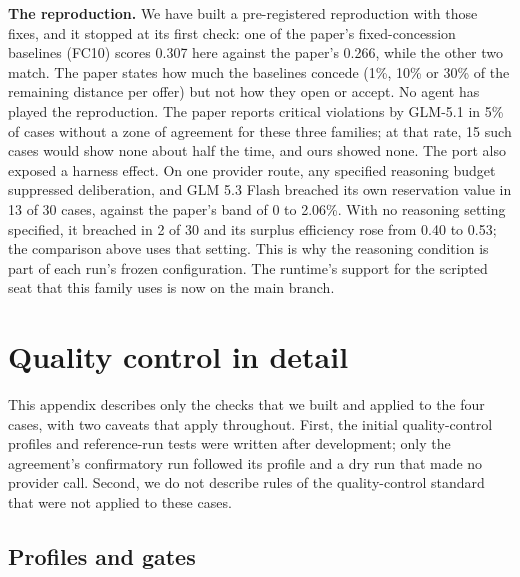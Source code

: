 \textbf{The reproduction.} We have built a pre-registered reproduction with those fixes, and it stopped at its first check: one of the paper's fixed-concession baselines (FC10) scores 0.307 here against the paper's 0.266, while
the other two match. The paper states how much the baselines concede (1\%, 10\% or 30\% of the remaining distance per
offer) but not how they open or accept. No agent has played the reproduction. The paper reports critical violations
by GLM-5.1 in 5\% of cases without a zone of agreement for these three families; at that rate, 15 such cases would show
none about half the time, and ours showed none. The port also exposed a harness effect. On one provider route, any
specified reasoning budget suppressed deliberation, and GLM 5.3 Flash breached its own reservation value in 13 of
30 cases, against the paper's band of 0 to 2.06\%. With no reasoning setting specified, it breached in 2 of 30 and its
surplus efficiency rose from 0.40 to 0.53; the comparison above uses that setting. This is why the reasoning condition
is part of each run's frozen configuration. The runtime's support for the scripted seat that this family uses is now
on the main branch.

\section{Quality control in detail}\label{quality-control-in-detail}

This appendix describes only the checks that we built and applied to the four cases, with two caveats that apply
throughout. First, the initial quality-control profiles and reference-run tests were written after development; only
the agreement's confirmatory run followed its profile and a dry run that made no provider call. Second, we do not
describe rules of the quality-control standard that were not applied to these cases.

\subsection{Profiles and gates}\label{profiles-and-gates}

